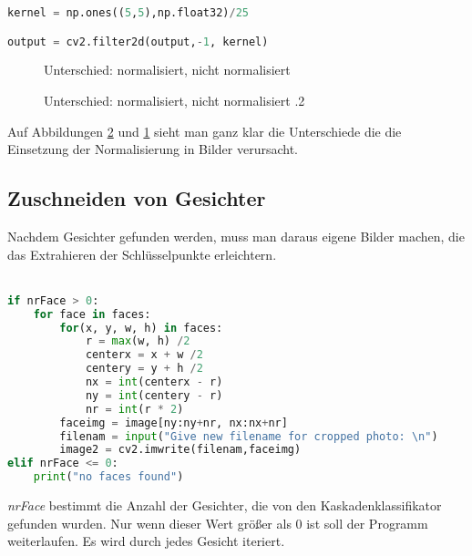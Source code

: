 \begin{lstlisting}[language=python,caption=Glättungsfilter,label=smooth]
kernel = np.ones((5,5),np.float32)/25

output = cv2.filter2d(output,-1, kernel)
\end{lstlisting}

\begin{figure}[H]
	\centering
	\qquad
	\caption{Unterschied: normalisiert, nicht normalisiert}
	\label{fig:norme}
	
\end{figure}

\begin{figure}[H]
	\centering
	\qquad
	\caption{Unterschied: normalisiert, nicht normalisiert .2}
	\label{fig:norm}
\end{figure}


Auf Abbildungen \ref{fig:norm} und \ref{fig:norme} sieht man ganz klar die Unterschiede die die Einsetzung der Normalisierung in Bilder verursacht. 

\subsection{Zuschneiden von Gesichter}

Nachdem Gesichter gefunden werden, muss man daraus eigene Bilder machen, die das Extrahieren der Schlüsselpunkte erleichtern.\\\\  

\begin{lstlisting}[language=python,caption=Code Abschnitt: Gesicht Zuschneiden,label=crop]
if nrFace > 0:
	for face in faces:
		for(x, y, w, h) in faces:
			r = max(w, h) /2 
			centerx = x + w /2 
			centery = y + h /2
			nx = int(centerx - r) 
			ny = int(centery - r) 
			nr = int(r * 2) 
		faceimg = image[ny:ny+nr, nx:nx+nr] 
		filenam = input("Give new filename for cropped photo: \n")
		image2 = cv2.imwrite(filenam,faceimg)
elif nrFace <= 0:
	print("no faces found")

\end{lstlisting}
\justify
\textit{nrFace} bestimmt die Anzahl der Gesichter, die von den Kaskadenklassifikator gefunden wurden. 
Nur wenn dieser Wert größer als 0 ist soll der Programm weiterlaufen.  
Es wird durch jedes Gesicht iteriert.

